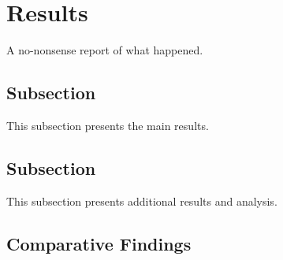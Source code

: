 \section{Results}
\textcolor{black!40}{A no-nonsense report of what happened.}
\subsection{Subsection}
This subsection presents the main results.

\textcolor{black!30}{\lipsum[40-44]}


\subsection{Subsection}
This subsection presents additional results and analysis.

\textcolor{black!30}{\lipsum[45-48]}

\subsection{Comparative Findings}
\textcolor{black!30}{\lipsum[49-52]}


